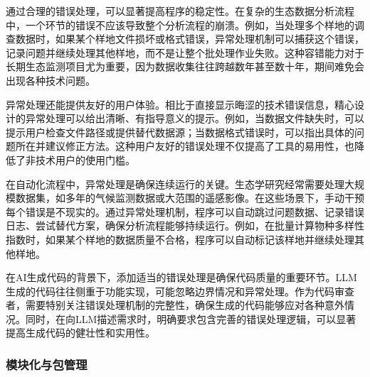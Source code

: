 \documentclass[
  twoside]{book}
\begin{document}
通过合理的错误处理，可以显著提高程序的稳定性。在复杂的生态数据分析流程中，一个环节的错误不应该导致整个分析流程的崩溃。例如，当处理多个样地的调查数据时，如果某个样地文件损坏或格式错误，异常处理机制可以捕获这个错误，记录问题并继续处理其他样地，而不是让整个批处理作业失败。这种容错能力对于长期生态监测项目尤为重要，因为数据收集往往跨越数年甚至数十年，期间难免会出现各种技术问题。

异常处理还能提供友好的用户体验。相比于直接显示晦涩的技术错误信息，精心设计的异常处理可以给出清晰、有指导意义的提示。例如，当数据文件缺失时，可以提示用户检查文件路径或提供替代数据源；当数据格式错误时，可以指出具体的问题所在并建议修正方法。这种用户友好的错误处理不仅提高了工具的易用性，也降低了非技术用户的使用门槛。

在自动化流程中，异常处理是确保连续运行的关键。生态学研究经常需要处理大规模数据集，如多年的气候监测数据或大范围的遥感影像。在这些场景下，手动干预每个错误是不现实的。通过异常处理机制，程序可以自动跳过问题数据、记录错误日志、尝试替代方案，确保分析流程能够持续运行。例如，在批量计算物种多样性指数时，如果某个样地的数据质量不合格，程序可以自动标记该样地并继续处理其他样地。

在AI生成代码的背景下，添加适当的错误处理是确保代码质量的重要环节。LLM生成的代码往往侧重于功能实现，可能忽略边界情况和异常处理。作为代码审查者，需要特别关注错误处理机制的完整性，确保生成的代码能够应对各种意外情况。同时，在向LLM描述需求时，明确要求包含完善的错误处理逻辑，可以显著提高生成代码的健壮性和实用性。

\hypertarget{ux6a21ux5757ux5316ux4e0eux5305ux7ba1ux7406}{%
\subsubsection{模块化与包管理}\label{ux6a21ux5757ux5316ux4e0eux5305ux7ba1ux7406}}
\end{document}
